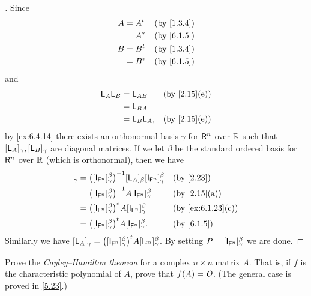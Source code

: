\begin{proof}[]
  Since
  \begin{align*}
    A & = \tp{A} &  & \text{(by \cref{1.3.4})} \\
      & = A^*    &  & \text{(by \cref{6.1.5})} \\
    B & = \tp{B} &  & \text{(by \cref{1.3.4})} \\
      & = B^*    &  & \text{(by \cref{6.1.5})}
  \end{align*}
  and
  \begin{align*}
    \L_A \L_B & = \L_{AB}    &  & \text{(by \cref{2.15}(e))} \\
              & = \L_{BA}                                    \\
              & = \L_B \L_A, &  & \text{(by \cref{2.15}(e))}
  \end{align*}
  by \cref{ex:6.4.14} there exists an orthonormal basis \(\gamma\) for \(\mathsf{R}^n\) over \(\mathbb{R}\) such that \([\mathsf{L}_A]_{\gamma}, [\mathsf{L}_B]_{\gamma}\) are diagonal matrices.
  If we let \(\beta\) be the standard ordered basis for \(\mathsf{R}^n\) over \(\mathbb{R}\) (which is orthonormal), then we have
  \begin{align*}
    [\L_A]_{\gamma} & = \pa{[\IT[\vs{F}^n]]_{\gamma}^{\beta}}^{-1} [\L_A]_{\beta} [\IT[\vs{F}^n]]_{\gamma}^{\beta} &  & \text{(by \cref{2.23})}         \\
                    & = \pa{[\IT[\vs{F}^n]]_{\gamma}^{\beta}}^{-1} A [\IT[\vs{F}^n]]_{\gamma}^{\beta}              &  & \text{(by \cref{2.15}(a))}      \\
                    & = \pa{[\IT[\vs{F}^n]]_{\gamma}^{\beta}}^* A [\IT[\vs{F}^n]]_{\gamma}^{\beta}                 &  & \text{(by \cref{ex:6.1.23}(c))} \\
                    & = \tp{\pa{[\IT[\vs{F}^n]]_{\gamma}^{\beta}}} A [\IT[\vs{F}^n]]_{\gamma}^{\beta}.             &  & \text{(by \cref{6.1.5})}
  \end{align*}
  Similarly we have \([\L_A]_{\gamma} = \tp{\pa{[\IT[\vs{F}^n]]_{\gamma}^{\beta}}} A [\IT[\vs{F}^n]]_{\gamma}^{\beta}\).
  By setting \(P = [\IT[\vs{F}^n]]_{\gamma}^{\beta}\) we are done.
\end{proof}

\begin{ex}\label{ex:6.4.16}
  Prove the \emph{Cayley--Hamilton theorem} for a complex \(n \times n\) matrix \(A\).
  That is, if \(f\) is the characteristic polynomial of \(A\), prove that \(f(A) = \mathit{O}\).
  (The general case is proved in \cref{5.23}.)
\end{ex}


